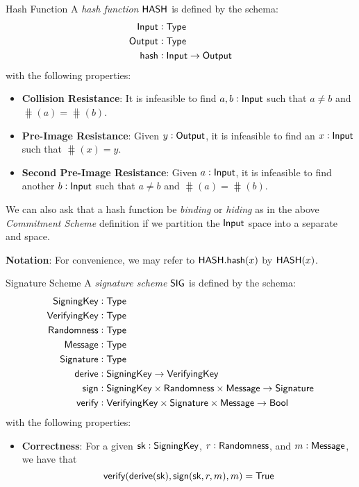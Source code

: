 \begin{definitiontoc}{Hash Function}
    A \emph{hash function} ${\textsf{HASH}}$ is defined by the schema:
    \begin{align*}
        {\textsf{Input}}  &: {\textsf{Type}} \\
        {\textsf{Output}} &: {\textsf{Type}} \\
        {\textsf{hash}}   &: {\textsf{Input}} \to {\textsf{Output}}
    \end{align*}
    with the following properties:
    \begin{itemize}
        \item \textbf{Collision Resistance}: It is infeasible to find $a, b : {\textsf{Input}}$ such that $a \ne b$ and $\hash(a) = \hash(b)$.
        \item \textbf{Pre-Image Resistance}: Given $y : {\textsf{Output}}$, it is infeasible to find an $x : {\textsf{Input}}$ such that $\hash(x) = y$.
        \item \textbf{Second Pre-Image Resistance}: Given $a : {\textsf{Input}}$, it is infeasible to find another $b : {\textsf{Input}}$ such that $a \ne b$ and $\hash(a) = \hash(b)$.
    \end{itemize}

    We can also ask that a hash function be \emph{binding} or \emph{hiding} as in the above \emph{Commitment Scheme} definition if we partition the ${\textsf{Input}}$ space into a separate \Randomness{} and \Input{} space.

    \textbf{Notation}: For convenience, we may refer to ${\textsf{HASH}}.{\textsf{hash}}(x)$ by ${\textsf{HASH}}(x)$.
\end{definitiontoc}

\begin{definitiontoc}{Signature Scheme}
    A \emph{signature scheme} ${\textsf{SIG}}$ is defined by the schema:
    \begin{align*}
        {\textsf{SigningKey}}   &: {\textsf{Type}} \\
        {\textsf{VerifyingKey}} &: {\textsf{Type}} \\
        {\textsf{Randomness}}   &: {\textsf{Type}} \\
        {\textsf{Message}}      &: {\textsf{Type}} \\
        {\textsf{Signature}}    &: {\textsf{Type}} \\
        {\textsf{derive}}       &: {\textsf{SigningKey}} \to {\textsf{VerifyingKey}} \\
        {\textsf{sign}}         &: {\textsf{SigningKey}} \times {\textsf{Randomness}} \times {\textsf{Message}} \to {\textsf{Signature}} \\
        {\textsf{verify}}       &: {\textsf{VerifyingKey}} \times {\textsf{Signature}} \times {\textsf{Message}} \to {\textsf{Bool}}
    \end{align*}
    with the following properties:
    \begin{itemize}
        \item \textbf{Correctness}: For a given ${\textsf{sk}} : {\textsf{SigningKey}}$, $r : {\textsf{Randomness}}$, and $m : {\textsf{Message}}$, we have that 
            \[{\textsf{verify}}({\textsf{derive}}({\textsf{sk}}), {\textsf{sign}}({\textsf{sk}}, r, m), m) = {\textsf{True}}\]
    \end{itemize}
\end{definitiontoc}


